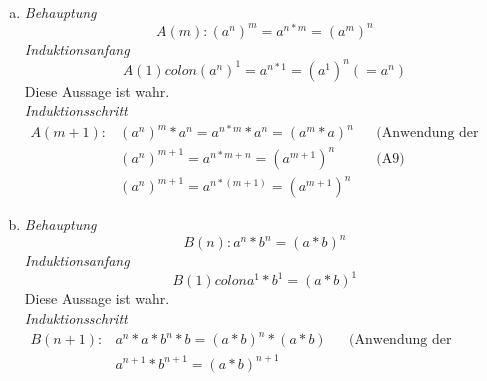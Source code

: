 \documentclass{article}
\begin{document}
\begin{enumerate}[a)]
\item
  \emph{Behauptung}
  \[
    A(m) \colon (a^n)^m = a^{n * m} = (a^m)^n
  \]
  \emph{Induktionsanfang}
  \[
    A(1) colon (a^n)^1 = a^{n * 1} = (a^1)^n (= a^n) 
  \]
  Diese Aussage ist wahr. \\
  \emph{Induktionsschritt}
  \begin{align*}
    A(m + 1) \colon &(a^n)^m * a^n = a^{n * m} * a^{n} = (a^m * a) ^ n  &&  \text{(Anwendung der Definition der Potenz)}\\
                    &(a^n)^{m + 1} = a^{n * m + n} = (a^{m + 1})^n      && \text{(A9)} \\
                    &(a^n)^{m + 1} = a^{n * (m + 1)} = (a^{m + 1})^n
  \end{align*}

\item
    \emph{Behauptung}
  \[
    B(n) \colon a^n * b^n = (a * b)^n
  \]
  \emph{Induktionsanfang}
  \[
    B(1) colon a^1 * b^1 = (a * b)^1 
  \]
  Diese Aussage ist wahr. \\
  \emph{Induktionsschritt}
  \begin{align*}
    B(n + 1) \colon &a^n * a * b^n * b = (a * b)^n * (a * b) &&  \text{(Anwendung der Definition der Potenz)}\\
                    &a^{n + 1} * b^{n + 1} = (a * b)^{n + 1}
  \end{align*}
\end{enumerate}
\end{document}
